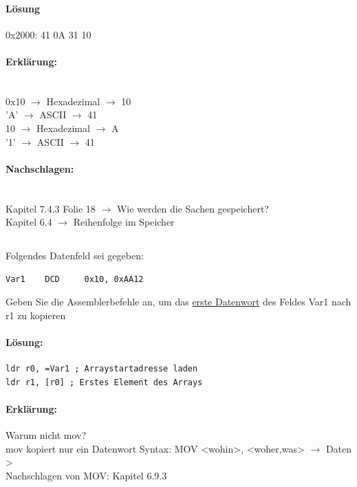 \documentclass[12pt,twoside,a4paper]{article}
\begin{document}
\paragraph*{Lösung}
0x2000: 41 0A 31 10 \\


\paragraph*{Erklärung:}
\\
0x10 $\rightarrow$ Hexadezimal $\rightarrow$ 10\\
'A' $\rightarrow$ ASCII $\rightarrow$ 41\\
10 $\rightarrow$ Hexadezimal $\rightarrow$ A\\
'1' $\rightarrow$ ASCII $\rightarrow$ 41\\

\paragraph*{Nachschlagen:}\\
Kapitel 7.4.3 Folie 18 $\rightarrow$ Wie werden die Sachen gespeichert?\\
Kapitel 6.4 $\rightarrow$ Reihenfolge im Speicher\\

\subsection{}
Folgendes Datenfeld sei gegeben:
\begin{lstlisting}
Var1 	DCD 	0x10, 0xAA12
\end{lstlisting}
Geben Sie die Assemblerbefehle an, um das \underline{erste Datenwort} des Feldes Var1 nach r1 zu kopieren

\paragraph*{Lösung:}
\begin{lstlisting}
ldr r0, =Var1 ; Arraystartadresse laden 
ldr r1, [r0] ; Erstes Element des Arrays
\end{lstlisting}
\paragraph*{Erklärung:}
Warum nicht mov?\\
mov kopiert nur ein Datenwort Syntax: MOV <wohin>, <woher,was> $\rightarrow$ Daten > \\
Nachschlagen von MOV: Kapitel 6.9.3\\
\end{document}
